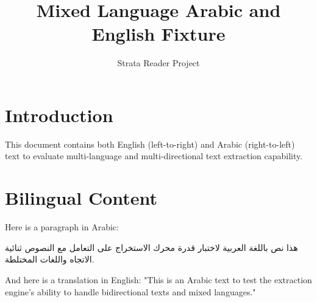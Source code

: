 \documentclass{article}
\title{Mixed Language Arabic and English Fixture}
\author{Strata Reader Project}
\begin{document}
\maketitle

\section{Introduction}
This document contains both English (left-to-right) and Arabic (right-to-left) text to evaluate multi-language and multi-directional text extraction capability.

\section{Bilingual Content}
Here is a paragraph in Arabic:

\begin{Arabic}
هذا نص باللغة العربية لاختبار قدرة محرك الاستخراج على التعامل مع النصوص ثنائية الاتجاه واللغات المختلطة.
\end{Arabic}

And here is a translation in English:
"This is an Arabic text to test the extraction engine's ability to handle bidirectional texts and mixed languages."
\end{document}

